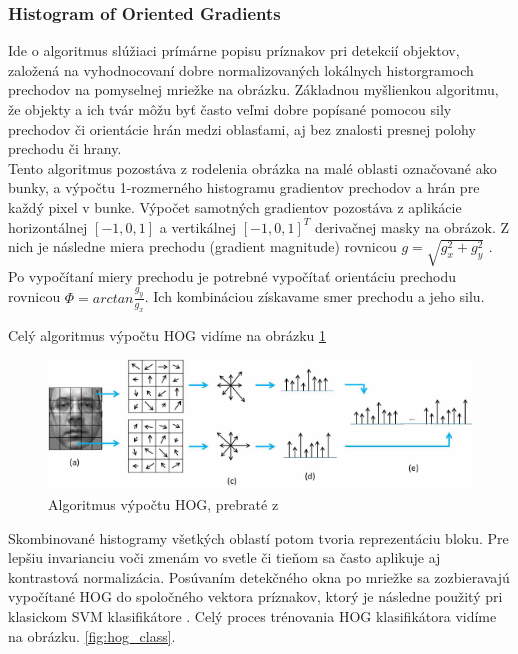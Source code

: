\subsubsection{Histogram of Oriented Gradients}
Ide o algoritmus slúžiaci prímárne popisu príznakov pri detekcií objektov, založená na vyhodnocovaní dobre normalizovaných lokálnych historgramoch prechodov na pomyselnej mriežke na obrázku.
Základnou myšlienkou algoritmu, že objekty a ich tvár môžu byť často veľmi dobre popísané pomocou sily prechodov či orientácie hrán medzi oblasťami, aj bez znalosti presnej polohy prechodu či hrany.\cite{dalal2005histograms} \\


\indent Tento algoritmus pozostáva z rodelenia obrázka na malé oblasti označované ako bunky, a výpočtu 1-rozmerného histogramu gradientov prechodov a hrán pre každý pixel v bunke\cite{dalal2005histograms}.
Výpočet samotných gradientov pozostáva z aplikácie horizontálnej $ [-1, 0, 1] $ a vertikálnej $ [-1, 0, 1]^T $ derivačnej masky na obrázok.
Z nich je následne miera prechodu (gradient magnitude) rovnicou $ g = \sqrt{g_{x}^2 + g_{y}^2}$ \cite{Histogra74}.
Po vypočítaní miery prechodu je potrebné vypočítať orientáciu prechodu rovnicou $ \Phi = arctan\frac{g_{y}}{g_{x}}$.
Ich kombináciou získavame smer prechodu a jeho silu.

Celý algoritmus výpočtu HOG vidíme na obrázku \ref{fig:hog}

\begin{figure}[H]
	\centering
	\includegraphics[width=1\linewidth]{img/hog}
	\caption{Algoritmus výpočtu HOG, prebraté z \cite{HOGextra27}}
	\label{fig:hog}
\end{figure}



\indent Skombinované histogramy všetkých oblastí potom tvoria reprezentáciu bloku.
Pre lepšiu invarianciu voči zmenám vo svetle či tieňom sa často aplikuje aj kontrastová normalizácia.
Posúvaním detekčného okna po mriežke sa zozbieravajú vypočítané HOG do spoločného vektora príznakov, ktorý je následne použitý pri klasickom SVM klasifikátore .
Celý proces trénovania HOG klasifikátora vidíme na obrázku. \ref{fig:hog_class}.

